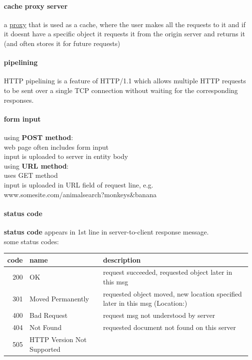 \documentclass[a4paper,12pt]{article}
\begin{document}
\paragraph{cache proxy server}
\label{sec:org044a2f7}
a \hyperref[sec:org00e635d]{proxy} that is used as a cache, where the user makes all the requests to it and if it doesnt have a specific object it requests it from the origin server and returns it (and often stores it for future requests)\\
\paragraph{pipelining}
\label{sec:org27d755b}
HTTP pipelining is a feature of HTTP/1.1 which allows multiple HTTP requests to be sent over a single TCP connection without waiting for the corresponding responses.\\
\paragraph{form input}
\label{sec:org2c9d01a}
using \textbf{POST method}:\\
web page often includes form input\\
input is uploaded to server in entity body\\
using \textbf{URL method}:\\
uses GET method\\
input is uploaded in URL field of request line, e.g. www.somesite.com/animalsearch?monkeys\&banana\\
\paragraph{status code}
\label{sec:org60d1de4}
\textbf{status code} appears in 1st line in server-to-client response message.\\
some status codes:\\
\begin{center}
\begin{tabular}{rll}
code & name & description\\
\hline
200 & OK & request succeeded, requested object later in this msg\\
301 & Moved Permanently & requested object moved, new location specified later in this msg (Location:)\\
400 & Bad Request & request msg not understood by server\\
404 & Not Found & requested document not found on this server\\
505 & HTTP Version Not Supported & \\
\end{tabular}
\end{center}
\end{document}
